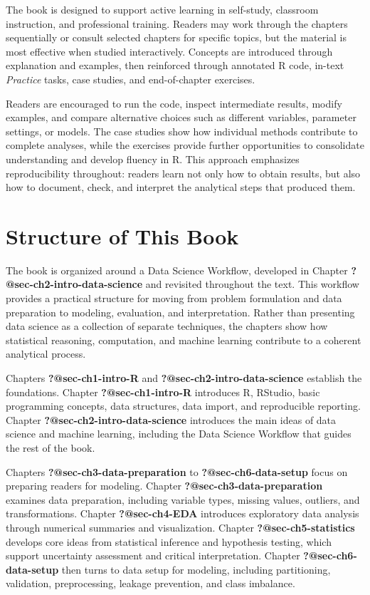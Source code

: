 \documentclass[
  letterpaper,
]{svmono}
\numberwithin{example}{subsection}
\begin{document}

The book is designed to support active learning in self-study, classroom
instruction, and professional training. Readers may work through the
chapters sequentially or consult selected chapters for specific topics,
but the material is most effective when studied interactively. Concepts
are introduced through explanation and examples, then reinforced through
annotated R code, in-text \emph{Practice} tasks, case studies, and
end-of-chapter exercises.

Readers are encouraged to run the code, inspect intermediate results,
modify examples, and compare alternative choices such as different
variables, parameter settings, or models. The case studies show how
individual methods contribute to complete analyses, while the exercises
provide further opportunities to consolidate understanding and develop
fluency in R. This approach emphasizes reproducibility throughout:
readers learn not only how to obtain results, but also how to document,
check, and interpret the analytical steps that produced them.

\section*{Structure of This Book}\label{structure-of-this-book}


The book is organized around a Data Science Workflow, developed in
Chapter \textbf{?@sec-ch2-intro-data-science} and revisited throughout
the text. This workflow provides a practical structure for moving from
problem formulation and data preparation to modeling, evaluation, and
interpretation. Rather than presenting data science as a collection of
separate techniques, the chapters show how statistical reasoning,
computation, and machine learning contribute to a coherent analytical
process.

Chapters \textbf{?@sec-ch1-intro-R} and
\textbf{?@sec-ch2-intro-data-science} establish the foundations. Chapter
\textbf{?@sec-ch1-intro-R} introduces R, RStudio, basic programming
concepts, data structures, data import, and reproducible reporting.
Chapter \textbf{?@sec-ch2-intro-data-science} introduces the main ideas
of data science and machine learning, including the Data Science
Workflow that guides the rest of the book.

Chapters \textbf{?@sec-ch3-data-preparation} to
\textbf{?@sec-ch6-data-setup} focus on preparing readers for modeling.
Chapter \textbf{?@sec-ch3-data-preparation} examines data preparation,
including variable types, missing values, outliers, and transformations.
Chapter \textbf{?@sec-ch4-EDA} introduces exploratory data analysis
through numerical summaries and visualization. Chapter
\textbf{?@sec-ch5-statistics} develops core ideas from statistical
inference and hypothesis testing, which support uncertainty assessment
and critical interpretation. Chapter \textbf{?@sec-ch6-data-setup} then
turns to data setup for modeling, including partitioning, validation,
preprocessing, leakage prevention, and class imbalance.
\end{document}
